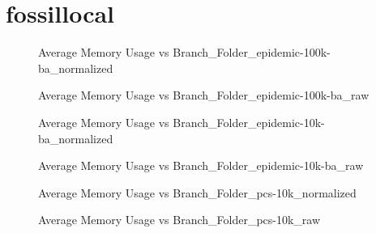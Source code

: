 \section{fossillocal}
\begin{figure}[H]
\centering

\caption{Average Memory Usage vs Branch\_Folder\_epidemic-100k-ba\_normalized}
\end{figure}
\vspace{1cm}
\begin{figure}[H]
\centering

\caption{Average Memory Usage vs Branch\_Folder\_epidemic-100k-ba\_raw}
\end{figure}
\vspace{1cm}
\newpage
\begin{figure}[H]
\centering

\caption{Average Memory Usage vs Branch\_Folder\_epidemic-10k-ba\_normalized}
\end{figure}
\vspace{1cm}
\begin{figure}[H]
\centering

\caption{Average Memory Usage vs Branch\_Folder\_epidemic-10k-ba\_raw}
\end{figure}
\vspace{1cm}
\newpage
\begin{figure}[H]
\centering

\caption{Average Memory Usage vs Branch\_Folder\_pcs-10k\_normalized}
\end{figure}
\vspace{1cm}
\begin{figure}[H]
\centering

\caption{Average Memory Usage vs Branch\_Folder\_pcs-10k\_raw}
\end{figure}
